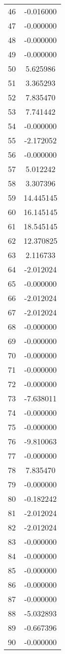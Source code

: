 \documentclass[12pt]{article}
\begin{document}
\begin{longtable}{@{}cc@{}}
46 & -0.016000 \\
47 & -0.000000 \\
48 & -0.000000 \\
49 & -0.000000 \\
50 & 5.625986 \\
51 & 3.365293 \\
52 & 7.835470 \\
53 & 7.741442 \\
54 & -0.000000 \\
55 & -2.172052 \\
56 & -0.000000 \\
57 & 5.012242 \\
58 & 3.307396 \\
59 & 14.445145 \\
60 & 16.145145 \\
61 & 18.545145 \\
62 & 12.370825 \\
63 & 2.116733 \\
64 & -2.012024 \\
65 & -0.000000 \\
66 & -2.012024 \\
67 & -2.012024 \\
68 & -0.000000 \\
69 & -0.000000 \\
70 & -0.000000 \\
71 & -0.000000 \\
72 & -0.000000 \\
73 & -7.638011 \\
74 & -0.000000 \\
75 & -0.000000 \\
76 & -9.810063 \\
77 & -0.000000 \\
78 & 7.835470 \\
79 & -0.000000 \\
80 & -0.182242 \\
81 & -2.012024 \\
82 & -2.012024 \\
83 & -0.000000 \\
84 & -0.000000 \\
85 & -0.000000 \\
86 & -0.000000 \\
87 & -0.000000 \\
88 & -5.032893 \\
89 & -0.667396 \\
90 & -0.000000 \\

\end{longtable}
\end{document}
